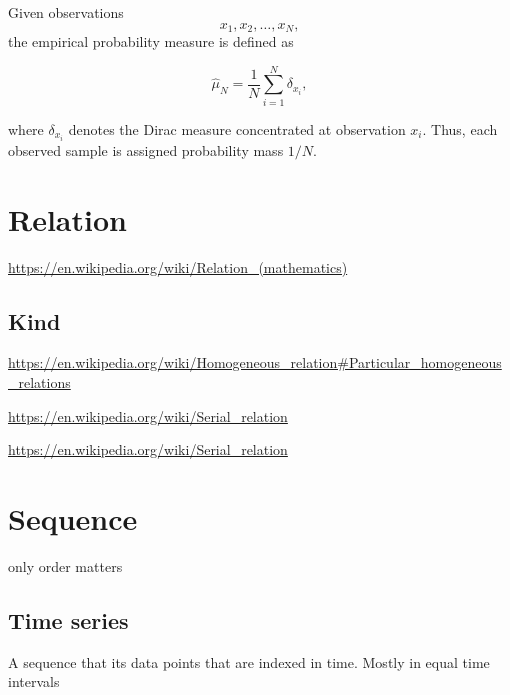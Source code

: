 \documentclass{book}
\begin{document}
      Given observations
      \[
      x_1,x_2,\ldots,x_N,
      \]
      the empirical probability measure is defined as

      \[
      \hat{\ensuremath{\mu}}_N
      =
      \frac{1}{N}
      \sum_{i=1}^{N}
      \ensuremath{\delta}_{x_i},
      \]

      where $\ensuremath{\delta}_{x_i}$ denotes the Dirac measure concentrated at observation
      $x_i$. Thus, each observed sample is assigned probability mass $1/N$.

\section{Relation}


\url{https://en.wikipedia.org/wiki/Relation_(mathematics)}

\subsection{Kind}


\url{https://en.wikipedia.org/wiki/Homogeneous_relation\#Particular_homogeneous_relations}


\url{https://en.wikipedia.org/wiki/Serial_relation}


\url{https://en.wikipedia.org/wiki/Serial_relation}

\section{Sequence}


only order matters

\subsection{Time series}


A sequence that its data points that are indexed in time. Mostly in equal time intervals
\end{document}
